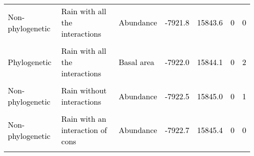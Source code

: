 \documentclass[
  12pt,
  letterpaper,
  DIV=11,
  numbers=noendperiod]{scrartcl}
\begin{document}
\begin{table}[H]
{\begin{tabular}[t]{lllllll}
\textcolor{black}{Non-phylogenetic} & \textcolor{black}{Rain with all the interactions} & \textcolor{black}{Abundance} & \textcolor{black}{-7921.8} & \textcolor{black}{15843.6} & \textcolor{black}{0} & \textcolor{black}{0}\\
\cellcolor{gray!6}{\textcolor{black}{Non-phylogenetic}} & \cellcolor{gray!6}{\textcolor{black}{Rain with an interaction of cona}} & \cellcolor{gray!6}{\textcolor{black}{Basal area}} & \cellcolor{gray!6}{\textcolor{black}{-7921.8}} & \cellcolor{gray!6}{\textcolor{black}{15843.7}} & \cellcolor{gray!6}{\textcolor{black}{0}} & \cellcolor{gray!6}{\textcolor{black}{3}}\\
\textcolor{black}{Phylogenetic} & \textcolor{black}{Rain with all the interactions} & \textcolor{black}{Basal area} & \textcolor{black}{-7922.0} & \textcolor{black}{15844.1} & \textcolor{black}{0} & \textcolor{black}{2}\\
\addlinespace
\cellcolor{gray!6}{\textcolor{black}{Phylogenetic}} & \cellcolor{gray!6}{\textcolor{black}{Rain without interactions}} & \cellcolor{gray!6}{\textcolor{black}{Basal area}} & \cellcolor{gray!6}{\textcolor{black}{-7922.1}} & \cellcolor{gray!6}{\textcolor{black}{15844.3}} & \cellcolor{gray!6}{\textcolor{black}{0}} & \cellcolor{gray!6}{\textcolor{black}{1}}\\
\textcolor{black}{Non-phylogenetic} & \textcolor{black}{Rain without interactions} & \textcolor{black}{Abundance} & \textcolor{black}{-7922.5} & \textcolor{black}{15845.0} & \textcolor{black}{0} & \textcolor{black}{1}\\
\cellcolor{gray!6}{\textcolor{black}{Phylogenetic}} & \cellcolor{gray!6}{\textcolor{black}{Rain with an interaction of cons and cona}} & \cellcolor{gray!6}{\textcolor{black}{Basal area}} & \cellcolor{gray!6}{\textcolor{black}{-7922.6}} & \cellcolor{gray!6}{\textcolor{black}{15845.1}} & \cellcolor{gray!6}{\textcolor{black}{0}} & \cellcolor{gray!6}{\textcolor{black}{1}}\\
\textcolor{black}{Non-phylogenetic} & \textcolor{black}{Rain with an interaction of cons} & \textcolor{black}{Abundance} & \textcolor{black}{-7922.7} & \textcolor{black}{15845.4} & \textcolor{black}{0} & \textcolor{black}{0}\\
\cellcolor{gray!6}{\textcolor{black}{Non-phylogenetic}} & \cellcolor{gray!6}{\textcolor{black}{Rain with all the interactions}} & \cellcolor{gray!6}{\textcolor{black}{Basal area}} & \cellcolor{gray!6}{\textcolor{black}{-7923.0}} & \cellcolor{gray!6}{\textcolor{black}{15846.0}} & \cellcolor{gray!6}{\textcolor{black}{0}} & \cellcolor{gray!6}{\textcolor{black}{0}}\\

\end{tabular}}
\end{table}
\end{document}
